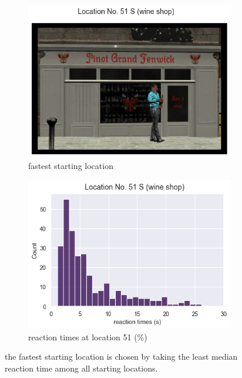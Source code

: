 \begin{figure}[h!]
	\centering
	\begin{subfigure}[b]{0.48\linewidth}
		\includegraphics[width=\linewidth]{figures/fastest_loc_RT_withHA_23.png}
		\caption{fastest starting location}
		\label{fig:fastest_loc}
	\end{subfigure}
	\begin{subfigure}[b]{0.48\linewidth}
		\includegraphics[width=\linewidth]{figures/fastest_loc_RT_dist_51_23.png}
		\caption{reaction times at location 51 (\%)}
		\label{fig:fastest_loc_dist}
	\end{subfigure}
	
	\caption[Fastest starting location]{the fastest starting location is chosen by taking the least median reaction time among all starting locations.}
\end{figure}
\label{fig:fastest_location}



